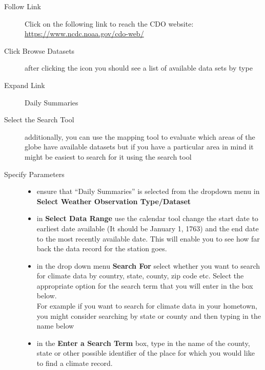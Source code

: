 \documentclass{article}\usepackage[]{graphicx}\usepackage[]{xcolor}
\begin{document}
\begin{description}
  \item[Follow Link] Click on the following link to reach the CDO website: \\ \url{https://www.ncdc.noaa.gov/cdo-web/} 
  \item[Click Browse Datasets] after clicking the icon you should see a list of available data sets by type
  \item[Expand Link] Daily Summaries
  \item[Select the Search Tool] additionally, you can use the mapping tool to evaluate which areas of the globe have available datasets but if you have a particular area in mind it might be easiest to search for it using the search tool
  \item[Specify Parameters] \hspace{30mm}
    \begin{itemize}
    \item ensure that ``Daily Summaries'' is selected from the dropdown menu in \textbf{Select Weather Observation Type/Dataset}
    \item in \textbf{Select Data Range} use the calendar tool change the start date to earliest date available (It should be January 1, 1763) and the end date to the most recently available date. This will enable you to see how far back the data record for the station goes.  
    \item in the drop down menu \textbf{Search For} select whether you want to search for climate data by country, state, county, zip code etc. Select the appropriate option for the search term that you will enter in the box below. \\ For example if you want to search for climate data in your hometown, you might consider searching by state or county and then typing in the name below
    \item in the \textbf{Enter a Search Term} box, type in the name of the county, state or other possible identifier of the place for which you would like to find a climate record.
    \end{itemize}


\end{description}
\end{document}
